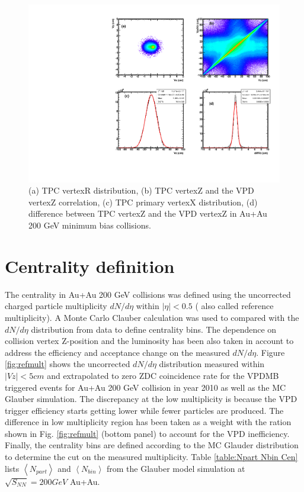\begin{figure}
\begin{centering}
\includegraphics[angle=270,scale=0.7]{fig/3.Analysis/Additional/BasicQA/QA_fig1}
\par\end{centering}

\protect\caption{(a) TPC vertexR distribution, (b) TPC vertexZ and the VPD vertexZ
correlation, (c) TPC primary vertexX distribution, (d) difference
between TPC vertexZ and the VPD vertexZ in Au+Au 200 GeV minimum bias
collisions.}


\label{fig:vertex}
\end{figure}



\section{Centrality definition }

The centrality in Au+Au 200 GeV collisions was defined using the uncorrected
charged particle multiplicity $dN/d\eta$ within $|\eta|<0.5$ ( also
called reference multiplicity). A Monte Carlo Clauber calculation
was used to compared with the $dN/d\eta$ distribution from data to
define centrality bins. The dependence on collision vertex Z-position
and the luminosity has been also taken in account to address the efficiency
and acceptance change on the measured $dN/d\eta$. Figure \ref{fig:refmult}
shows the uncorrected $dN/d\eta$ distribution measured within $|Vz|<5cm$
and extrapolated to zero ZDC coincidence rate for the VPDMB triggered
events for Au+Au 200 GeV collision in year 2010 as well as the MC
Glauber simulation. The discrepancy at the low multiplicity is because
the VPD trigger efficiency starts getting lower while fewer particles
are produced. The difference in low multiplicity region has been taken
as a weight with the ration shown in Fig. \ref{fig:refmult} (bottom
panel) to account for the VPD inefficiency. Finally, the centrality
bins are defined according to the MC Glauder distribution to determine
the cut on the measured multiplicity. Table \ref{table:Npart Nbin Cen}
lists $\left\langle N_{part}\right\rangle $ and $\left\langle N_{bin}\right\rangle $
from the Glauber model simulation at $\sqrt{S_{NN}}=200GeV$ Au+Au.

